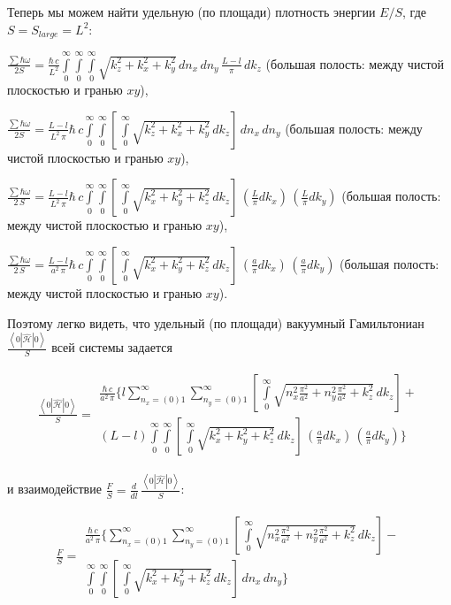 \documentclass[11pt]{article}
\begin{document}
    Теперь мы можем найти удельную (по площади) плотность энергии \(E/S\),
где \(S = S_{large} = L^2\):

\(\frac{\sum\hbar\omega}{2 S} = \frac{\hbar\,c}{L^2}\int\limits_{0}^{\infty}\int\limits_{0}^{\infty}\int\limits_{0}^{\infty}\sqrt{k_z^2+k_x^2+k_y^2}\,dn_x\,dn_y\,\frac{L-l}{\pi}\,dk_z\)
(большая полость: между чистой плоскостью и гранью \(xy\)),

\(\frac{\sum\hbar\omega}{2 S} = \frac{L-l}{L^2\,\pi}\hbar\,c\int\limits_{0}^{\infty}\int\limits_{0}^{\infty}\left[\,\int\limits_{0}^{\infty}\sqrt{k_z^2+k_x^2+k_y^2}\,dk_z\right]\,dn_x\,dn_y\)
(большая полость: между чистой плоскостью и гранью \(xy\)),

\(\frac{\sum\hbar\omega}{2\,S} = \frac{L-l}{L^2\,\pi}\hbar\,c\int\limits_{0}^{\infty}\int\limits_{0}^{\infty}\left[\,\int\limits_{0}^{\infty}\sqrt{k_x^2+k_y^2+k_z^2}\,dk_z\right]\,\left(\frac{L}{\pi}dk_x\right)\,\left(\frac{L}{\pi}dk_y\right)\)
(большая полость: между чистой плоскостью и гранью \(xy\)),

\(\frac{\sum\hbar\omega}{2\,S} = \frac{L-l}{a^2\,\pi}\hbar\,c\int\limits_{0}^{\infty}\int\limits_{0}^{\infty}\left[\,\int\limits_{0}^{\infty}\sqrt{k_x^2+k_y^2+k_z^2}\,dk_z\right]\,\left(\frac{a}{\pi}dk_x\right)\,\left(\frac{a}{\pi}dk_y\right)\)
(большая полость: между чистой плоскостью и гранью \(xy\)).

    Поэтому легко видеть, что удельный (по площади) вакуумный Гамильтониан
\(\frac{\left<0|\hat{\mathcal{H}}|0\right>}{S}\) всей системы задается

\[\begin{array}{lr}
\frac{\left<0|\hat{\mathcal{H}}|0\right>}{S} =
\begin{array}{c}\frac{\hbar\,c}{a^2\,\pi}\Bigg\{l\sum\limits_{n_x=(0)1}^{\infty}\sum\limits_{n_y=(0)1}^{\infty}\left[\,\int\limits_{0}^{\infty}\sqrt{n_x^2\frac{\pi^2}{a^2}+n_y^2\frac{\pi^2}{a^2}+k_z^2}\,dk_z\right] + \\
(L-l)\int\limits_{0}^{\infty}\int\limits_{0}^{\infty}\left[\,\int\limits_{0}^{\infty}\sqrt{k_x^2+k_y^2+k_z^2}\,dk_z\right]\,\left(\frac{a}{\pi}dk_x\right)\,\left(\frac{a}{\pi}dk_y\right)\Bigg\}
\end{array}\end{array}\]

и взаимодействие
\(\frac{F}{S} = \frac{d}{dl} \,\frac{\left<0|\hat{\mathcal{H}}|0\right>}{S}\):

\[\begin{array}{lr}\frac{F}{S} =
\begin{array}{c}\frac{\hbar\,c}{a^2\,\pi}\Bigg\{\sum\limits_{n_x=(0)1}^{\infty}\sum\limits_{n_y=(0)1}^{\infty}\left[\,\int\limits_{0}^{\infty}\sqrt{n_x^2\frac{\pi^2}{a^2}+n_y^2\frac{\pi^2}{a^2}+k_z^2}\,dk_z\right] - \\
\int\limits_{0}^{\infty}\int\limits_{0}^{\infty}\left[\,\int\limits_{0}^{\infty}\sqrt{k_x^2+k_y^2+k_z^2}\,dk_z\right]\,dn_x\,dn_y\Bigg\}\end{array}\end{array}\]
\end{document}
